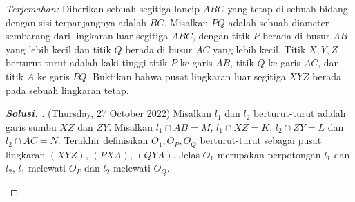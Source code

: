 \documentclass[letterpaper, 13pt]{scrartcl}
\begin{document}
\textit{Terjemahan: } Diberikan sebuah segitiga lancip $ABC$ yang tetap di sebuah bidang dengan sisi terpanjangnya adalah $BC$. Misalkan $PQ$ adalah sebuah diameter sembarang dari lingkaran luar segitiga $ABC$, dengan titik $P$ berada di busur $AB$ yang lebih kecil  dan titik $Q$ berada di busur $AC$ yang lebih kecil. Titik $X,Y,Z$ berturut-turut adalah kaki tinggi titik $P$ ke garis $AB$, titik $Q$ ke garis $AC$, dan titik $A$ ke garis $PQ$. Buktikan bahwa pusat lingkaran luar segitiga $XYZ$ berada pada sebuah lingkaran tetap.

\begin{proof}[\textbf{Solusi. }] (Thursday, 27 October 2022) Misalkan $l_1$ dan $l_2$ berturut-turut adalah garis sumbu $XZ$ dan $ZY$. Misalkan $l_1 \cap AB = M$, $l_1 \cap XZ = K$, $l_2 \cap ZY = L$ dan $l_2 \cap AC = N$.  Terakhir definisikan $O_1, O_P, O_Q$ berturut-turut sebagai pusat lingkaran $(XYZ)$, $(PXA)$, $(QYA)$. Jelas $O_1$ merupakan perpotongan $l_1$ dan $l_2$, $l_1$ melewati $O_P$ dan $l_2$ melewati $O_Q$.

\begin{center}
\end{center}
\end{proof}
\end{document}
